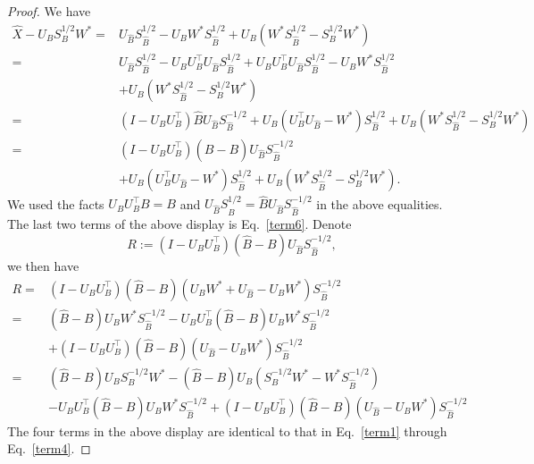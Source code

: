 \begin{proof}
We have 
        \begin{align*}
          \hat{X} - U_B S_B^{1/2} W^*  
           = & U_{\hat{B}} S_{\hat{B}}^{1/2} - U_B W^* S_{\hat{B}}^{1/2} + U_B (W^* S_{\hat{B}}^{1/2} - S_{B}^{1/2} W^*) \\
           = & U_{\hat{B}} S_{\hat{B}}^{1/2} - U_B U_B^{\top} U_{\hat{B}} S_{\hat{B}}^{1/2} + U_B U_B^{\top} U_{\hat{B}} S_{\hat{B}}^{1/2} - U_B W^* S_{\hat{B}}^{1/2} \\
          & + U_B (W^* S_{\hat{B}}^{1/2} - S_{B}^{1/2} W^*) \\
           = & (I - U_B U_B^{\top}) \hat{B} U_{\hat{B}} S_{\hat{B}}^{-1/2} + U_B (U_B^{\top} U_{\hat{B}} - W^{*}) S_{\hat{B}}^{1/2} + U_B (W^* S_{\hat{B}}^{1/2} - S_{B}^{1/2} W^*) \\
          = & (I - U_B U_B^{\top}) (\hat{B} - B) U_{\hat{B}} S_{\hat{B}}^{-1/2}\\
          & + U_B (U_B^{\top} U_{\hat{B}} - W^*) S_{\hat{B}}^{1/2} + U_B (W^* S_{\hat{B}}^{1/2} - S_{B}^{1/2} W^*). 
        \end{align*}
        We used the facts $ U_B U_B^\top B = B$ and $U_{\hat{B}} S_{\hat{B}}^{1/2} = \hat{B} U_{\hat{B}} S_{\hat{B}}^{-1/2}$ in the above equalities. The last two terms of the above display is Eq.~\eqref{term6}. 
        Denote  
        $$R :=(I - U_B U_B^{\top}) (\hat{B} - B) U_{\hat{B}} S_{\hat{B}}^{-1/2},$$ we then have
        \begin{equation*}
        \begin{split}
        R  = & (I - U_B U_B^{\top}) (\hat{B} - B) ( U_BW^* + U_{\hat{B}} - U_{B} W^{*}) S_{\hat{B}}^{-1/2}   \\
            = & (\hat{B} -B) U_B W^* S_{\hat{B}}^{-1/2} - U_B U_B^{\top} (\hat{B} - B) U_B W^* S_{\hat{B}}^{-1/2} \\
          & + (I - U_B U_B^{\top}) (\hat{B} - B) (U_{\hat{B}} - U_{B} W^{*}) S_{\hat{B}}^{-1/2}  \\
           = & ( \hat{B} - B) U_B S_B^{-1/2} W^{*} 
           - (\hat{B} - B) U_B (S_{B}^{-1/2} W^{*} - W^{*} S_{\hat{B}}^{-1/2}) \\
          & - U_B U_B^{\top} (\hat{B} - B) U_B W^* S_{\hat{B}}^{-1/2} 
            + (I - U_B U_B^{\top}) (\hat{B} - B) (U_{\hat{B}} - U_{B} W^{*})S_{\hat{B}}^{-1/2}
           \end{split}
        \end{equation*}
        The four terms in the above display are identical to that in Eq.~\eqref{term1} through Eq.~\eqref{term4}.
\end{proof}

